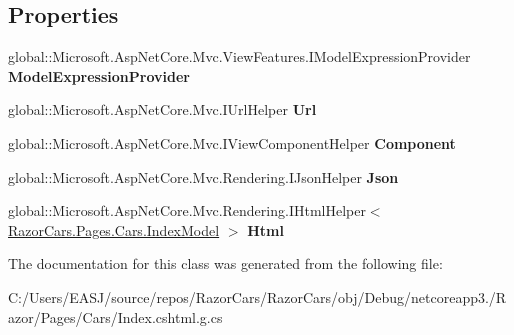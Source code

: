 \subsection*{Properties}
\begin{DoxyCompactItemize}
\item 
\mbox{\label{class_razor_cars_1_1_pages_1_1_cars_1_1_pages___cars___index_a6a7763f51f68ed04b5e06e5cfd3e50c9}} 
global\+::\+Microsoft.\+Asp\+Net\+Core.\+Mvc.\+View\+Features.\+I\+Model\+Expression\+Provider {\bfseries Model\+Expression\+Provider}
\item 
\mbox{\label{class_razor_cars_1_1_pages_1_1_cars_1_1_pages___cars___index_a7bb5ed66bd322fc77d2f1cf2c8aca00c}} 
global\+::\+Microsoft.\+Asp\+Net\+Core.\+Mvc.\+I\+Url\+Helper {\bfseries Url}
\item 
\mbox{\label{class_razor_cars_1_1_pages_1_1_cars_1_1_pages___cars___index_a0336ec47875699a0b506d8c5d3f99b21}} 
global\+::\+Microsoft.\+Asp\+Net\+Core.\+Mvc.\+I\+View\+Component\+Helper {\bfseries Component}
\item 
\mbox{\label{class_razor_cars_1_1_pages_1_1_cars_1_1_pages___cars___index_adc85616bcd7e2e6093625c687ff399c6}} 
global\+::\+Microsoft.\+Asp\+Net\+Core.\+Mvc.\+Rendering.\+I\+Json\+Helper {\bfseries Json}
\item 
\mbox{\label{class_razor_cars_1_1_pages_1_1_cars_1_1_pages___cars___index_a1c462c633b2d0b124ff806e73cb70323}} 
global\+::\+Microsoft.\+Asp\+Net\+Core.\+Mvc.\+Rendering.\+I\+Html\+Helper$<$ \mbox{\hyperlink{class_razor_cars_1_1_pages_1_1_cars_1_1_index_model}{Razor\+Cars.\+Pages.\+Cars.\+Index\+Model}} $>$ {\bfseries Html}
\end{DoxyCompactItemize}


The documentation for this class was generated from the following file\+:\begin{DoxyCompactItemize}
\item 
C\+:/\+Users/\+E\+A\+S\+J/source/repos/\+Razor\+Cars/\+Razor\+Cars/obj/\+Debug/netcoreapp3./\+Razor/\+Pages/\+Cars/Index.\+cshtml.\+g.\+cs\end{DoxyCompactItemize}
